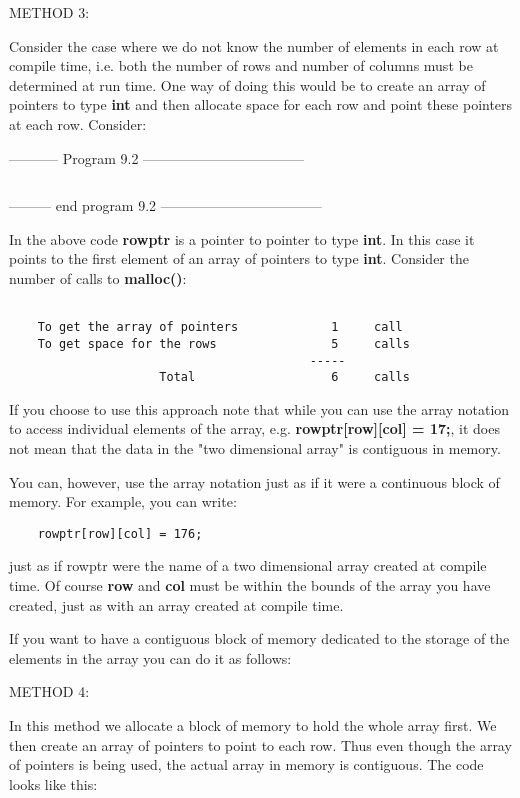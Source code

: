 METHOD 3:

Consider the case where we do not know the number of elements in each
row at compile time, i.e. both the number of rows and number of columns
must be determined at run time. One way of doing this would be to create
an array of pointers to type \textbf{int} and then allocate space for
each row and point these pointers at each row. Consider:

-----------  Program 9.2  -----------------------------------
\inputminted[breaklines]{c}{../src/ch9-2.c}
--------- end program 9.2 -----------------------------------

In the above code \textbf{rowptr} is a pointer to pointer to type
\textbf{int}. In this case it points to the first element of an array of
pointers to type \textbf{int}. Consider the number of calls to
\textbf{malloc()}:

\begin{verbatim}

    To get the array of pointers             1     call
    To get space for the rows                5     calls
                                          -----
                     Total                   6     calls
\end{verbatim}

If you choose to use this approach note that while you can use the array
notation to access individual elements of the array, e.g.
\textbf{rowptr{[}row{]}{[}col{]} = 17;}, it does not mean that the data
in the "two dimensional array" is contiguous in memory.

You can, however, use the array notation just as if it were a continuous
block of memory. For example, you can write:

\begin{verbatim}
    rowptr[row][col] = 176;
\end{verbatim}

just as if rowptr were the name of a two dimensional array created at
compile time. Of course \textbf{row} and \textbf{col} must be within the
bounds of the array you have created, just as with an array created at
compile time.

If you want to have a contiguous block of memory dedicated to the
storage of the elements in the array you can do it as follows:

METHOD 4:

In this method we allocate a block of memory to hold the whole array
first. We then create an array of pointers to point to each row. Thus
even though the array of pointers is being used, the actual array in
memory is contiguous. The code looks like this:

